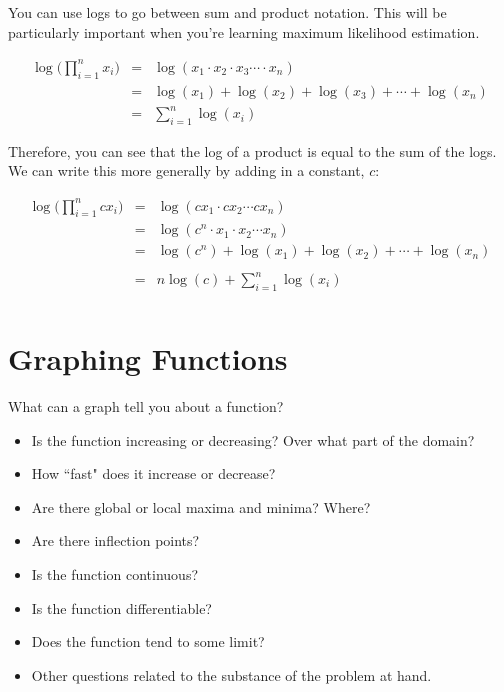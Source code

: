 \documentclass[]{book}
\providecommand{\tightlist}{%
  \setlength{\itemsep}{0pt}\setlength{\parskip}{0pt}}
\theoremstyle{definition}
\theoremstyle{definition}
\theoremstyle{definition}
\theoremstyle{remark}
\begin{document}
You can use logs to go between sum and product notation. This will be
particularly important when you're learning maximum likelihood
estimation.

\begin{eqnarray*}
            \log \bigg(\prod\limits_{i=1}^n x_i \bigg) &=& \log(x_1 \cdot x_2 \cdot x_3 \cdots \cdot x_n)\\
            &=& \log(x_1) + \log(x_2) + \log(x_3) + \cdots + \log(x_n)\\
            &=& \sum\limits_{i=1}^n \log (x_i)
\end{eqnarray*}

Therefore, you can see that the log of a product is equal to the sum of
the logs. We can write this more generally by adding in a constant,
\(c\):

\begin{eqnarray*}
            \log \bigg(\prod\limits_{i=1}^n c x_i\bigg) &=& \log(cx_1 \cdot cx_2 \cdots cx_n)\\
            &=& \log(c^n \cdot x_1 \cdot x_2 \cdots x_n)\\
            &=& \log(c^n) + \log(x_1) + \log(x_2) + \cdots + \log(x_n)\\\\
            &=& n \log(c) +  \sum\limits_{i=1}^n \log (x_i)\\
\end{eqnarray*}

\section{Graphing Functions}\label{graphing-functions}

What can a graph tell you about a function?

\begin{itemize}
\tightlist
\item
  Is the function increasing or decreasing? Over what part of the
  domain?
\item
  How ``fast" does it increase or decrease?
\item
  Are there global or local maxima and minima? Where?
\item
  Are there inflection points?
\item
  Is the function continuous?
\item
  Is the function differentiable?
\item
  Does the function tend to some limit?
\item
  Other questions related to the substance of the problem at hand.
\end{itemize}
\end{document}

